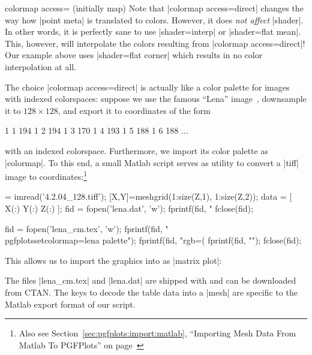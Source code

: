 \begin{pgfplotskey}{colormap access= (initially map)%
}
    Note that |colormap access=direct| changes the way how |point meta| is
    translated to colors. However, it does \emph{not affect} |shader|. In other
    words, it is perfectly sane to use |shader=interp| or |shader=flat mean|.
    This, however, will interpolate the colors resulting from
    |colormap access=direct|! Our example above uses |shader=flat corner| which
    results in no color interpolation at all.

    The choice |colormap access=direct| is actually like a color palette for
    images with indexed colorspaces: suppose we use the famous ``Lena''
    image~\cite{lena}, downsample it to $128\times 128$, and export it to
    coordinates of the form
\begin{codeexample}
1 1 194
1 2 194
1 3 170
1 4 193
1 5 188
1 6 188
...
\end{codeexample}
    with an indexed colorspace. Furthermore, we import its color palette as
    \PGFPlots{} |colormap|. To this end, a small Matlab script serves as
    utility to convert a |tiff| image to coordinates:\footnote{Also see
    Section~\ref{sec:pgfplots:import:matlab}, ``Importing Mesh Data From Matlab
    To PGFPlots'' on page~\pageref{sec:pgfplots:import:matlab}}
\begin{codeexample} = imread('4.2.04_128.tiff');
[X,Y]=meshgrid(1:size(Z,1), 1:size(Z,2));
data = [ X(:) Y(:) Z(:) ];
fid = fopen('lena.dat', 'w');
fprintf(fid, "%
fclose(fid);

fid = fopen('lena_cm.tex', 'w');
fprintf(fid, "\\pgfplotsset{colormap={lena palette}{\n");
fprintf(fid, "rgb=(%
fprintf(fid, "}}\n");
fclose(fid);
\end{codeexample}
    This allows us to import the graphics into \PGFPlots{} as |matrix plot|:
%
\pgfplotsexpensiveexample
\begin{codeexample}[]
\end{codeexample}
    The files |lena_cm.tex| and |lena.dat| are shipped with \PGFPlots{} and can
    be downloaded from CTAN. The keys to decode the table data into a |mesh|
    are specific to the Matlab export format of our script.


\end{pgfplotskey}
